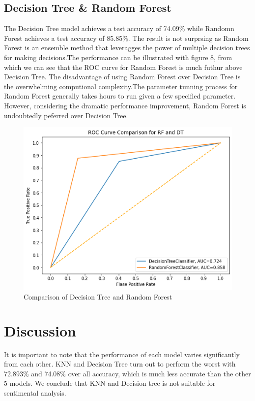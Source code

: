 \documentclass[10pt,twocolumn,letterpage]{article}
\begin{document}
		\subsection{Decision Tree \& Random Forest}
		The Decision Tree model achieves a test accuracy of 74.09\% while Randomn Forest achieves a test accuracy of 85.85\%. The result is not surprsing as Random Forest is an ensemble method that leveragges the power of multiple decision trees for making decisions.The performance can be illustrated with figure 8, from which we can see that the ROC curve for Random Forest is much futhur above Decision Tree. The disadvantage of using Random Forest over Decision Tree is the overwhelming computional complexity.The parameter tunning process for Random Forest generally takes hours to run given a few specified parameter. However, considering the dramatic performance improvement, Random Forest is undoubtedly peferred over Decision Tree.
	\begin{figure}[htbp]
			\includegraphics[width=\columnwidth]{ROC_RF_DT}
			\caption{Comparison of Decision Tree and Random Forest}\label{ROC_RF_DT}
		\end{figure} 
	\section{Discussion}
	It is important to note that the performance of each model varies significantly from each other. KNN and Decision Tree turn out to perform the worst with 72.893\% and 74.08\% over all accuracy, which is much less accurate than the other 5 models. We conclude that KNN and Decision tree is not suitable for sentimental analysis. 
\end{document}
